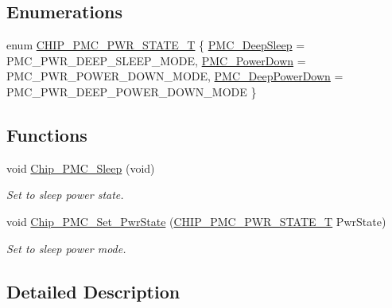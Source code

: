 \subsection*{Enumerations}
\begin{DoxyCompactItemize}
\item 
enum \hyperlink{group___p_m_c__18_x_x__43_x_x_ga69f642b5034785c56bb9c45e4dd780de}{C\+H\+I\+P\+\_\+\+P\+M\+C\+\_\+\+P\+W\+R\+\_\+\+S\+T\+A\+T\+E\+\_\+T} \{ \hyperlink{group___p_m_c__18_x_x__43_x_x_gga69f642b5034785c56bb9c45e4dd780dea31d40a23015643fcc99a943b65841164}{P\+M\+C\+\_\+\+Deep\+Sleep} = P\+M\+C\+\_\+\+P\+W\+R\+\_\+\+D\+E\+E\+P\+\_\+\+S\+L\+E\+E\+P\+\_\+\+M\+O\+DE, 
\hyperlink{group___p_m_c__18_x_x__43_x_x_gga69f642b5034785c56bb9c45e4dd780dea9ab5cbaebd32ff7ae5414220e7281b04}{P\+M\+C\+\_\+\+Power\+Down} = P\+M\+C\+\_\+\+P\+W\+R\+\_\+\+P\+O\+W\+E\+R\+\_\+\+D\+O\+W\+N\+\_\+\+M\+O\+DE, 
\hyperlink{group___p_m_c__18_x_x__43_x_x_gga69f642b5034785c56bb9c45e4dd780dea9076408a570dc195ff5615835a93d678}{P\+M\+C\+\_\+\+Deep\+Power\+Down} = P\+M\+C\+\_\+\+P\+W\+R\+\_\+\+D\+E\+E\+P\+\_\+\+P\+O\+W\+E\+R\+\_\+\+D\+O\+W\+N\+\_\+\+M\+O\+DE
 \}
\end{DoxyCompactItemize}
\subsection*{Functions}
\begin{DoxyCompactItemize}
\item 
void \hyperlink{group___p_m_c__18_x_x__43_x_x_ga38f5a78a75086be129f7be269d8320d4}{Chip\+\_\+\+P\+M\+C\+\_\+\+Sleep} (void)
\begin{DoxyCompactList}\small\item\em Set to sleep power state. \end{DoxyCompactList}\item 
void \hyperlink{group___p_m_c__18_x_x__43_x_x_ga8b70604e37d7db74a727abe576933208}{Chip\+\_\+\+P\+M\+C\+\_\+\+Set\+\_\+\+Pwr\+State} (\hyperlink{group___p_m_c__18_x_x__43_x_x_ga69f642b5034785c56bb9c45e4dd780de}{C\+H\+I\+P\+\_\+\+P\+M\+C\+\_\+\+P\+W\+R\+\_\+\+S\+T\+A\+T\+E\+\_\+T} Pwr\+State)
\begin{DoxyCompactList}\small\item\em Set to sleep power mode. \end{DoxyCompactList}\end{DoxyCompactItemize}


\subsection{Detailed Description}


